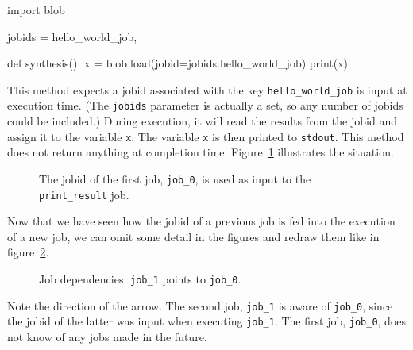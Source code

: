 \documentclass[a4paper]{article}
\begin{document}
\begin{python}
import blob
  
jobids = {hello_world_job,}

def synthesis():
    x = blob.load(jobid=jobids.hello_world_job)
    print(x)
\end{python}

This method expects a jobid associated with the key
\texttt{hello\_world\_job} is input at execution time.  (The
\texttt{jobids} parameter is actually a set, so any number of jobids
could be included.)  During execution, it will read the results from
the jobid and assign it to the variable \texttt{x}.  The variable
\texttt{x} is then printed to \texttt{stdout}.  This method does not
return anything at completion time.
Figure~\ref{fig:execflow-print-result} illustrates the situation.

\begin{figure}[h!]
  \begin{center}
    
    \caption{The jobid of the first job, \texttt{job\_0}, is used as
      input to the \texttt{print\_result} job.}
    \label{fig:execflow-print-result}
  \end{center}
\end{figure}

Now that we have seen how the jobid of a previous job is
fed into the execution of a new job, we can omit some detail in the
figures and redraw them like in figure~\ref{fig:depflow-twojobs}.

\begin{figure}[h!]
  \begin{center}
    
    \caption{Job dependencies.  \texttt{job\_1} points to
      \texttt{job\_0}.}
    \label{fig:depflow-twojobs}
  \end{center}
\end{figure}

\noindent Note the direction of the arrow.  The second job,
\texttt{job\_1} is aware of \texttt{job\_0}, since the jobid of the
latter was input when executing \texttt{job\_1}.  The first job,
\texttt{job\_0}, does not know of any jobs made in the future.
\end{document}
